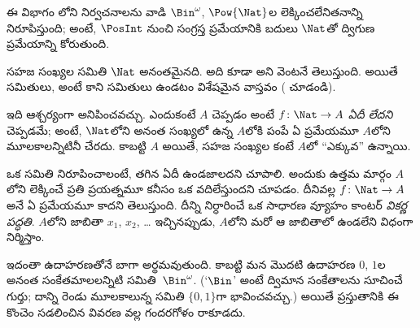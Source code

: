 \documentclass[../../../include/open-logic-section]{subfiles}
\begin{document}


\begin{editorial}
  ఈ విభాగం లోని నిర్వచనాలను వాడి
  $\Bin^\omega$, $\Pow{\Nat}$ల లెక్కించలేనితనాన్ని నిరూపిస్తుంది;
  అంటే, $\PosInt$ నుంచి సంగ్రస్త ప్రమేయానికి బదులు $\Nat$తో ద్విగుణ
  ప్రమేయాన్ని కోరుతుంది.
\end{editorial}

\begin{explain}
సహజ సంఖ్యల సమితి $\Nat$ అనంతమైనది. అది 
కూడా అని వెంటనే తెలుస్తుంది. అయితే \emph{} సమితులు, అంటే 
కాని సమితులు ఉండటం విశేషమైన వాస్తవం
( చూడండి).

ఇది ఆశ్చర్యంగా అనిపించవచ్చు. ఎందుకంటే $A$ 
చెప్పడం అంటే  $f \colon \Nat \to A$ \emph{ఏదీ లేదని}
చెప్పడమే; అంటే, $\Nat$లోని అనంత సంఖ్యలో ఉన్న  $A$లోకి పంపే ఏ
ప్రమేయమూ $A$లోని మూలకాలన్నిటినీ చేరదు. కాబట్టి $A$ 
అయితే, సహజ సంఖ్యల కంటే $A$లో ``ఎక్కువ''  ఉన్నాయి.

ఒక సమితి  నిరూపించాలంటే, తగిన 
ఏదీ ఉండజాలదని చూపాలి. అందుకు ఉత్తమ మార్గం $A$లోని 
లెక్కించే ప్రతి ప్రయత్నమూ కనీసం ఒక  వదిలేస్తుందని
చూపడం. దీనివల్ల $f\colon \Nat \to A$ అనే ఏ ప్రమేయమూ 
కాదని తెలుస్తుంది. దీన్ని నిర్ధారించే ఒక సాధారణ వ్యూహం కాంటర్
\emph{వికర్ణ పద్ధతి}. $A$లోని  జాబితా $x_1$, $x_2$, \dots{}
ఇచ్చినప్పుడు, $A$లోని
మరో  ఆ జాబితాలో ఉండలేని విధంగా నిర్మిస్తాం.

ఇదంతా ఉదాహరణతోనే బాగా అర్థమవుతుంది. కాబట్టి మన మొదటి ఉదాహరణ $0$,
$1$ల అనంత సంకేతమాలలన్నిటి సమితి~$\Bin^\omega$. (`$\Bin$' అంటే ద్విమాన సంకేతాలను సూచించే గుర్తు;
దాన్ని రెండు మూలకాలున్న సమితి $\{0,1\}$గా భావించవచ్చు.)
అయితే ప్రస్తుతానికి ఈ కొంచెం సడలించిన వివరణ వల్ల గందరగోళం
రాకూడదు.
\end{explain}
\end{document}

